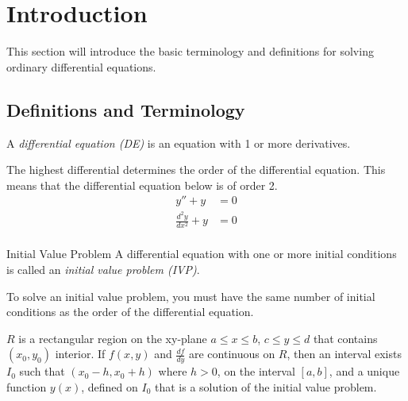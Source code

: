 \section{Introduction} \label{sec:Introduction}
This section will introduce the basic terminology and definitions for solving ordinary differential equations.
\subsection{Definitions and Terminology} \label{subsec:Definitions and Terminology}
\begin{definition} \label{def:Differential Equation}
  A \emph{differential equation (DE)} is an equation with 1 or more derivatives.
  \begin{remark}
    The highest differential determines the order of the differential equation.
    This means that the differential equation below is of order 2.
    \begin{align*}
      y'' + y &= 0 \\
      \frac{d^{2}y}{dx^{2}} + y &= 0 \\
    \end{align*}
  \end{remark}
\end{definition}
\begin{definition}{Initial Value Problem} \label{def:Initial Value Problem}
  A differential equation with one or more initial conditions is called an \emph{initial value problem (IVP)}.
  \begin{remark}
    To solve an initial value problem, you must have the same number of initial conditions as the order of the differential equation.
  \end{remark}
  \begin{remark}
    $R$ is a rectangular region on the xy-plane $a \leq x \leq b$, $c \leq y \leq d$ that contains $\left( x_{0}, y_{0} \right)$ interior.
    If $f \left( x,y \right)$ and $\frac{df}{dy}$ are continuous on $R$, then an interval exists $I_{0}$ such that $\left( x_{0}-h, x_{0}+h \right)$ where $h>0$, on the interval $\left[ a,b \right]$, and a unique function $y \left( x \right)$, defined on $I_{0}$ that is a solution of the initial value problem.
  \end{remark}
\end{definition}

